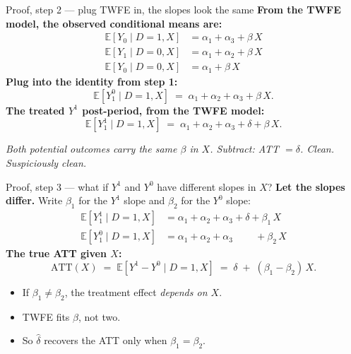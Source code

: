\documentclass[aspectratio=169,11pt]{beamer}
\begin{document}
\begin{frame}{Proof, step 2 --- plug TWFE in, the slopes look the same}
\vspace{0.4em}
\textbf{From the TWFE model, the observed conditional means are:}
\begin{align*}
\mathbb{E}[Y_0 \mid D{=}1, X] &= \alpha_1 + \alpha_3 + \beta\, X \\
\mathbb{E}[Y_1 \mid D{=}0, X] &= \alpha_1 + \alpha_2 + \beta\, X \\
\mathbb{E}[Y_0 \mid D{=}0, X] &= \alpha_1 + \beta\, X
\end{align*}
\textbf{Plug into the identity from step 1:}
\[
\mathbb{E}[Y^0_1 \mid D{=}1, X] \;=\; \alpha_1 + \alpha_2 + \alpha_3 + \beta\, X.
\]
\textbf{The treated $Y^1$ post-period, from the TWFE model:}
\[
\mathbb{E}[Y^1_1 \mid D{=}1, X] \;=\; \alpha_1 + \alpha_2 + \alpha_3 + \delta + \beta\, X.
\]
\begin{center}
\footnotesize\color{warmgray}\itshape
Both potential outcomes carry the \textit{same} $\beta$ in $X$. \;Subtract: ATT $= \delta$. \;Clean. \;\textit{Suspiciously clean.}
\end{center}
\end{frame}

\begin{frame}{Proof, step 3 --- what if $Y^1$ and $Y^0$ have different slopes in $X$?}
\vspace{0.4em}
\textbf{Let the slopes differ.} \;Write $\beta_1$ for the $Y^1$ slope and $\beta_2$ for the $Y^0$ slope:
\begin{align*}
\mathbb{E}[Y^1_1 \mid D{=}1, X] &= \alpha_1 + \alpha_2 + \alpha_3 + \delta + \boxed{\beta_1}\, X \\
\mathbb{E}[Y^0_1 \mid D{=}1, X] &= \alpha_1 + \alpha_2 + \alpha_3 \phantom{\;+\;\delta} + \boxed{\beta_2}\, X
\end{align*}
\vspace{0.1em}
\textbf{The true ATT given $X$:}
\[
\text{ATT}(X) \;=\; \mathbb{E}[Y^1 - Y^0 \mid D{=}1, X] \;=\; \delta \;+\; (\beta_1 - \beta_2)\, X.
\]
\vspace{0.2em}
\begin{itemize}\small
  \item If $\beta_1 \neq \beta_2$, the treatment effect \textit{depends on $X$}.
  \item TWFE fits  $\beta$, not two.
  \item So $\widehat{\delta}$ recovers the ATT only when $\beta_1 = \beta_2$.
\end{itemize}
\end{frame}
\end{document}

